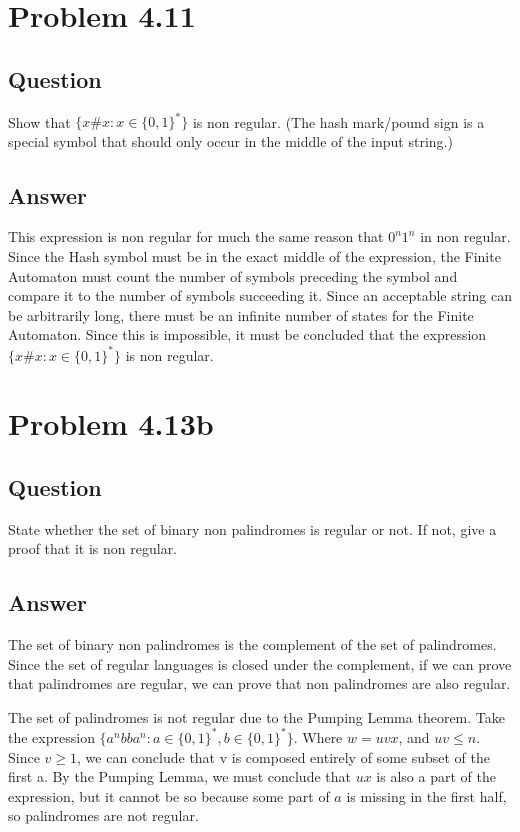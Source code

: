 \documentclass[12pt, a4paper]{article}
\begin{document}
\section{Problem 4.11}
\subsection{Question}
Show that $\{x\#x : x \in \{0,1\}^{*}\}$ is non regular. (The hash mark/pound sign is a special symbol that should only occur in the middle of the input string.)
\subsection{Answer}
This expression is non regular for much the same reason that $0^{n}1^{n}$ in non regular. Since the Hash symbol must be in the exact middle of the expression, the Finite Automaton must count the number of symbols preceding the symbol and compare it to the number of symbols succeeding it. Since an acceptable string can be arbitrarily long, there must be an infinite number of states for the Finite Automaton. Since this is impossible, it must be concluded that the expression $\{x\#x : x \in \{0,1\}^{*}\}$ is non regular.

\section{Problem 4.13b}
\subsection{Question}
State whether the set of binary non palindromes is regular or not. If not, give a proof that it is non regular.
\subsection{Answer}
The set of binary non palindromes is the complement of the set of palindromes. Since the set of regular languages is closed under the complement, if we can prove that palindromes are regular, we can prove that non palindromes are also regular.

The set of palindromes is not regular due to the Pumping Lemma theorem. Take the expression $\{a^{n}bba^{n} : a \in \{0,1\}^{*}, b \in \{0,1\}^{*}\}$. Where $w=uvx$, and $uv \leq n$. Since $v \geq 1$, we can conclude that v is composed entirely of some subset of the first a. By the Pumping Lemma, we must conclude that $ux$ is also a part of the expression, but it cannot be so because some part of $a$ is missing in the first half, so palindromes are not regular.
\end{document}
